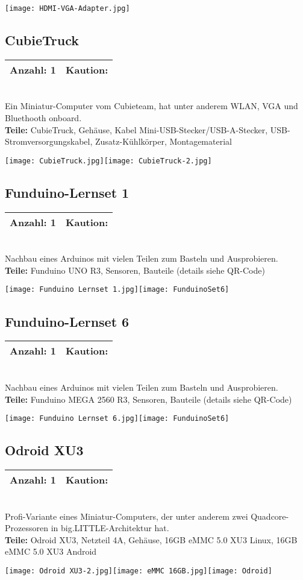 \documentclass[a4paper]{article}
\newcommand{\infobox}[3] %
        {\par
                \begin{tabular}{| c | c | }
                \hline
                Anzahl: #1 & Kaution: \EUR{#3}   \\
                \hline
                \end{tabular} \\
        }
\begin{document}
\texttt{[image: HDMI-VGA-Adapter.jpg]}

\subsection{CubieTruck}
\infobox{1}{1}{0}
Ein Miniatur-Computer vom Cubieteam, hat unter anderem WLAN, VGA und Bluethooth onboard. \\
\textbf{Teile:} CubieTruck, Gehäuse, Kabel Mini-USB-Stecker/USB-A-Stecker, USB-Stromversorgungskabel, Zusatz-Kühlkörper, Montagematerial

\texttt{[image: CubieTruck.jpg]}\texttt{[image: CubieTruck-2.jpg]}
\newpage
\subsection{Funduino-Lernset 1} 
\infobox{1}{2,50}{0}
Nachbau eines Arduinos mit vielen Teilen zum Basteln und Ausprobieren.\\
\textbf{Teile:} Funduino UNO R3, Sensoren, Bauteile (details siehe QR-Code)

\texttt{[image: Funduino Lernset 1.jpg]}\texttt{[image: FunduinoSet6]}

\subsection{Funduino-Lernset 6} 
\infobox{1}{2,50}{0}
Nachbau eines Arduinos mit vielen Teilen zum Basteln und Ausprobieren.\\
\textbf{Teile:} Funduino MEGA 2560 R3, Sensoren, Bauteile (details siehe QR-Code)

\texttt{[image: Funduino Lernset 6.jpg]}\texttt{[image: FunduinoSet6]}

\subsection{Odroid XU3} 
\infobox{1}{5}{20}
Profi-Variante eines Miniatur-Computers, der unter anderem zwei Quadcore-Prozessoren in big.LITTLE-Architektur hat.\\
\textbf{Teile:} Odroid XU3, Netzteil 4A, Gehäuse, 16GB eMMC 5.0 XU3 Linux, 16GB eMMC 5.0 XU3 Android

\texttt{[image: Odroid XU3-2.jpg]}\texttt{[image: eMMC 16GB.jpg]}\texttt{[image: Odroid]}
\newpage
\end{document}
